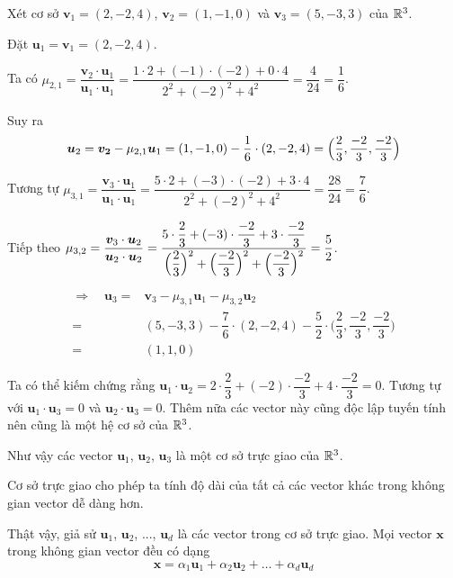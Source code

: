 \begin{example}
	Xét cơ sở $\bm{v}_1 = (2, -2, 4)$, $\bm{v}_2 = (1, -1, 0)$ và $\bm{v}_3 = (5, -3, 3)$ của $\mathbb{R}^3$.
	
	Đặt $\bm{u}_1 = \bm{v}_1 = (2, -2, 4)$.
	
	Ta có $\mu_{2,1} = \dfrac{\bm{v}_2 \cdot \bm{u}_1}{\bm{u}_1 \cdot \bm{u}_1} = \dfrac{1 \cdot 2 + (-1) \cdot (-2) + 0 \cdot 4}{2^2 + (-2)^2 + 4^2} = \dfrac{4}{24} = \dfrac{1}{6}$.
	
	Suy ra \[\bm{u}_2 = \bm{v_2} - \mu_{2, 1} \bm{u}_1 = (1, -1, 0) - \dfrac{1}{6} \cdot (2, -2, 4) = \Bigl(\dfrac{2}{3}, \dfrac{-2}{3}, \dfrac{-2}{3}\Bigr)\]
	
	Tương tự $\mu_{3, 1} = \dfrac{\bm{v}_3 \cdot \bm{u}_1}{\bm{u}_1 \cdot \bm{u}_1} = \dfrac{5 \cdot 2 + (-3) \cdot (-2) + 3 \cdot 4}{2^2 + (-2)^2 + 4^2} = \dfrac{28}{24} = \dfrac{7}{6}$.
	
	Tiếp theo $\mu_{3,2} = \dfrac{\bm{v}_3 \cdot \bm{u}_2}{\bm{u}_2 \cdot \bm{u}_2} = \dfrac{5 \cdot \dfrac{2}{3} + (-3) \cdot \dfrac{-2}{3} + 3 \cdot \dfrac{-2}{3}}{ \Bigl(\dfrac{2}{3}\Bigr)^2 + \Bigl(\dfrac{-2}{3}\Bigr)^2 + \Bigl(\dfrac{-2}{3}\Bigr)^2 } = \dfrac{5}{2}$.
	
	\begin{align*}
		\Rightarrow \quad \bm{u}_3 = & \bm{v}_3 - \mu_{3,1} \bm{u}_1 - \mu_{3,2} \bm{u}_2 \\ = & (5, -3, 3) - \dfrac{7}{6} \cdot (2, -2, 4) - \dfrac{5}{2} \cdot \Big(\dfrac{2}{3}, \dfrac{-2}{3}, \dfrac{-2}{3}\Big) \\ = & (1, 1, 0)
	\end{align*}
	
	Ta có thể kiếm chứng rằng $\bm{u}_1 \cdot \bm{u}_2 = 2 \cdot \dfrac{2}{3} + (-2) \cdot \dfrac{-2}{3} + 4 \cdot \dfrac{-2}{3} = 0$. Tương tự với $\bm{u}_1 \cdot \bm{u}_3 = 0$ và $\bm{u}_2 \cdot \bm{u}_3 = 0$. Thêm nữa các vector này cũng độc lập tuyến tính nên cũng là một hệ cơ sở của $\mathbb{R}^3$.
	
	Như vậy các vector $\bm{u}_1$, $\bm{u}_2$, $\bm{u}_3$ là một cơ sở trực giao của $\mathbb{R}^3$.
\end{example}

\begin{remark}
	Cơ sở trực giao cho phép ta tính độ dài của tất cả các vector khác trong không gian vector dễ dàng hơn.
\end{remark}

Thật vậy, giả sử $\bm{u}_1$, $\bm{u}_2$, ..., $\bm{u}_d$ là các vector trong cơ sở trực giao. Mọi vector $\bm{x}$ trong không gian vector đều có dạng\[\bm{x} = \alpha_1 \bm{u}_1 + \alpha_2 \bm{u}_2 + \ldots + \alpha_d \bm{u}_d\]

